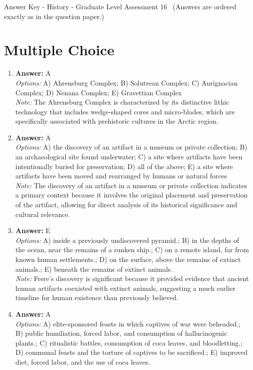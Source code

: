 \documentclass[12pt]{article}
\begin{document}
\begin{center}
Answer Key - History - Graduate Level Assessment 16 \
\small (Answers are ordered exactly as in the question paper.)
\end{center}

\section*{Multiple Choice}
\begin{enumerate}[label=\arabic*.]
\item \textbf{Answer:} A
\\ \textit{Options:} A) Ahrensburg Complex; B) Solutrean Complex; C) Aurignacian Complex; D) Nenana Complex; E) Gravettian Complex
\\ \textit{Note:} The Ahrensburg Complex is characterized by its distinctive lithic technology that includes wedge-shaped cores and micro-blades, which are specifically associated with prehistoric cultures in the Arctic region.
\item \textbf{Answer:} A
\\ \textit{Options:} A) the discovery of an artifact in a museum or private collection; B) an archaeological site found underwater; C) a site where artifacts have been intentionally buried for preservation; D) all of the above; E) a site where artifacts have been moved and rearranged by humans or natural forces
\\ \textit{Note:} The discovery of an artifact in a museum or private collection indicates a primary context because it involves the original placement and preservation of the artifact, allowing for direct analysis of its historical significance and cultural relevance.
\item \textbf{Answer:} E
\\ \textit{Options:} A) inside a previously undiscovered pyramid.; B) in the depths of the ocean, near the remains of a sunken ship.; C) on a remote island, far from known human settlements.; D) on the surface, above the remains of extinct animals.; E) beneath the remains of extinct animals.
\\ \textit{Note:} Frere's discovery is significant because it provided evidence that ancient human artifacts coexisted with extinct animals, suggesting a much earlier timeline for human existence than previously believed.
\item \textbf{Answer:} A
\\ \textit{Options:} A) elite-sponsored feasts in which captives of war were beheaded.; B) public humiliation, forced labor, and consumption of hallucinogenic plants.; C) ritualistic battles, consumption of coca leaves, and bloodletting.; D) communal feasts and the torture of captives to be sacrificed.; E) improved diet, forced labor, and the use of coca leaves.

\end{enumerate}
\end{document}
